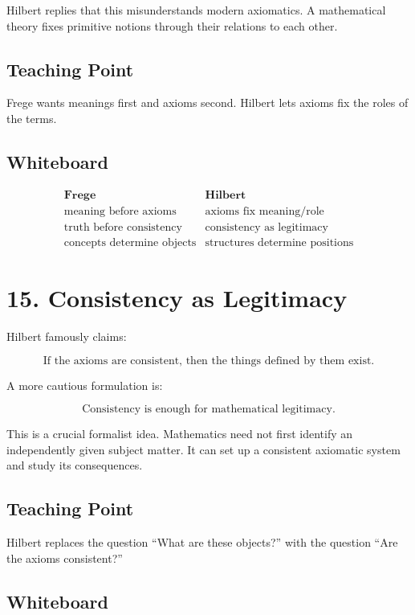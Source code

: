 \documentclass[11pt]{article}
\begin{document}
Hilbert replies that this misunderstands modern axiomatics. A mathematical theory fixes
primitive notions through their relations to each other.

\subsection*{Teaching Point}

Frege wants meanings first and axioms second. Hilbert lets axioms fix the roles of the
terms.

\subsection*{Whiteboard}

\[
\begin{array}{c|c}
\textbf{Frege} & \textbf{Hilbert} \\
\hline
\text{meaning before axioms} & \text{axioms fix meaning/role} \\
\text{truth before consistency} & \text{consistency as legitimacy} \\
\text{concepts determine objects} & \text{structures determine positions}
\end{array}
\]

\section*{15. Consistency as Legitimacy}

Hilbert famously claims:

\[
\boxed{
\text{If the axioms are consistent, then the things defined by them exist.}
}
\]

A more cautious formulation is:

\[
\boxed{
\text{Consistency is enough for mathematical legitimacy.}
}
\]

This is a crucial formalist idea. Mathematics need not first identify an independently
given subject matter. It can set up a consistent axiomatic system and study its
consequences.

\subsection*{Teaching Point}

Hilbert replaces the question ``What are these objects?'' with the question ``Are the
axioms consistent?''

\subsection*{Whiteboard}
\end{document}
